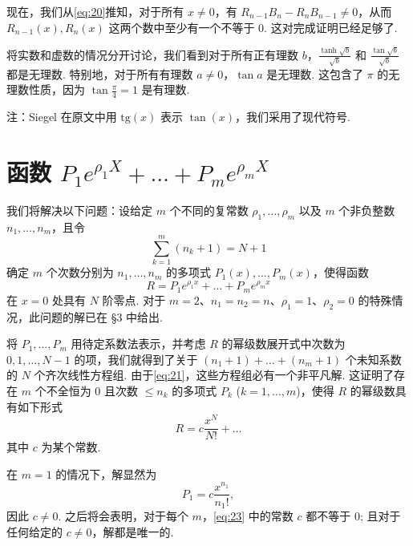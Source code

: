 现在，我们从\eqref{eq:20}推知，对于所有 $x \neq 0$，有 $R_{n-1}B_n - R_nB_{n-1} \neq 0$，从而 $R_{n-1}(x), R_n(x)$ 这两个数中至少有一个不等于 0. 这对完成证明已经足够了.

将实数和虚数的情况分开讨论，我们看到对于所有正有理数 $b$，$\frac{\tanh \sqrt{b}}{\sqrt{b}}$ 和 $\frac{\tan \sqrt{b}}{\sqrt{b}}$ 都是无理数. 特别地，对于所有有理数 $a \neq 0$，$\tan a$ 是无理数. 这包含了 $\pi$ 的无理数性质，因为 $\tan \frac{\pi}{4} = 1$ 是有理数.

\begin{remark} 注：Siegel 在原文中用 $\text{tg}(x)$ 表示 $\tan(x)$，我们采用了现代符号. \end{remark}

\section{函数 $P_1 e^{\rho_1 X} + \dots + P_m e^{\rho_m X}$}

我们将解决以下问题：设给定 $m$ 个不同的复常数 $\rho_1,\ldots,\rho_m$ 以及 $m$ 个非负整数 $n_1,\ldots,n_m$，且令
\begin{equation} \sum_{k=1}^{m} (n_k + 1) = N + 1 \tag{21}\label{eq:21} \end{equation}
确定 $m$ 个次数分别为 $n_1,\ldots,n_m$ 的多项式 $P_1(x),\ldots, P_m(x)$，使得函数
\begin{equation} R = P_{1}e^{\rho_{1}x} + \dots + P_{m}e^{\rho_{m}x} \tag{22}\label{eq:22} \end{equation} 
在 $x=0$ 处具有 $N$ 阶零点. 对于 $m=2$、$n_1=n_2=n$、$\rho_1=1$、$\rho_2=0$ 的特殊情况，此问题的解已在 \S 3 中给出.

将 $P_1, \dots, P_m$ 用待定系数法表示，并考虑 $R$ 的幂级数展开式中次数为 $0, 1, \dots, N-1$ 的项，我们就得到了关于 $(n_1+1) + \dots + (n_m+1)$ 个未知系数的 $N$ 个齐次线性方程组. 由于\eqref{eq:21}，这些方程组必有一个非平凡解. 这证明了存在 $m$ 个不全恒为 0 且次数 $\leq n_k$ 的多项式 $P_k$ ($k=1,\dots,m$)，使得 $R$ 的幂级数具有如下形式
\begin{equation} R = c \frac{x^{N}}{N!} + \dots \tag{23}\label{eq:23} \end{equation}
其中 $c$ 为某个常数.

在 $m=1$ 的情况下，解显然为
\[ P_1 = c \frac{x^{n_1}}{n_1!}, \]
因此 $c \neq 0$. 之后将会表明，对于每个 $m$，\eqref{eq:23} 中的常数 $c$ 都不等于 0; 且对于任何给定的 $c \neq 0$，解都是唯一的.

